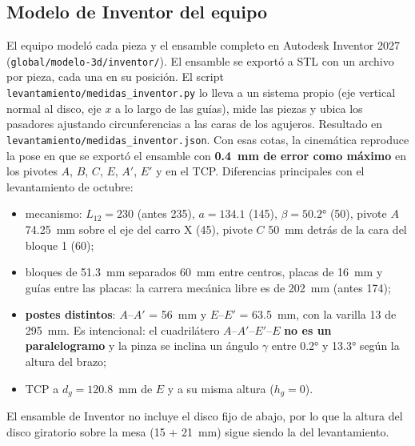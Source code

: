 \documentclass[a4paper,12pt]{article}
\newcommand{\codigo}[1]{\texttt{\small #1}}
\begin{document}
\subsection{Modelo de Inventor del equipo}\label{sec:inventor}
El equipo modeló cada pieza y el ensamble completo en Autodesk Inventor 2027 (\codigo{global/modelo-3d/inventor/}).
El ensamble se exportó a STL con un archivo por pieza, cada una en su posición. El script
\codigo{levantamiento/medidas\_inventor.py} lo lleva a un sistema propio (eje vertical normal al disco, eje
$x$ a lo largo de las guías), mide las piezas y ubica los pasadores ajustando circunferencias a las caras de
los agujeros. Resultado en \codigo{levantamiento/medidas\_inventor.json}. Con esas cotas, la cinemática reproduce la pose en que
se exportó el ensamble con \textbf{0.4~mm de error como máximo} en los pivotes $A$, $B$, $C$, $E$, $A'$, $E'$ y en
el TCP. Diferencias principales con el levantamiento de octubre:
\begin{itemize}
\item mecanismo: $L_{12} = 230$ (antes 235), $a = 134.1$ (145), $\beta = 50.2°$ (50), pivote $A$ 74.25~mm sobre
      el eje del carro X (45), pivote $C$ 50~mm detrás de la cara del bloque 1 (60);
\item bloques de 51.3~mm separados 60~mm entre centros, placas de 16~mm y guías entre las placas: la carrera
      mecánica libre es de 202~mm (antes 174);
\item \textbf{postes distintos}: $A$--$A'$ = 56~mm y $E$--$E'$ = 63.5~mm, con la varilla 13 de 295~mm. Es
      intencional: el cuadrilátero $A$--$A'$--$E'$--$E$ \textbf{no es un paralelogramo} y la pinza se inclina
      un ángulo $\gamma$ entre 0.2° y 13.3° según la altura del brazo;
\item TCP a $d_g = 120.8$~mm de $E$ y a su misma altura ($h_g = 0$).
\end{itemize}
El ensamble de Inventor no incluye el disco fijo de abajo, por lo que la altura del disco giratorio sobre la
mesa (15 + 21~mm) sigue siendo la del levantamiento.
\end{document}
